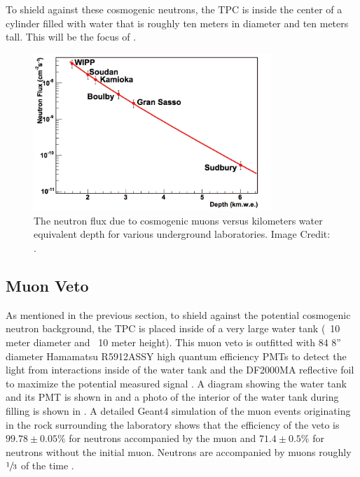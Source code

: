  To shield against these cosmogenic neutrons, the TPC is inside the center of a cylinder filled with water that is roughly ten meters in diameter and ten meters tall.  This will be the focus of . 
 
\begin{figure}[t]
	\centering
	\includegraphics[width=0.8\textwidth]{neutron_flux}
	\caption{The neutron flux due to cosmogenic muons versus kilometers water equivalent depth for various underground laboratories.    Image Credit: .}
	\label{fig:neutron_flux}
\end{figure}
 
 
 \subsection{Muon Veto}
 \label{sec:muon_veto}
 
 As mentioned in the previous section, to shield against the potential cosmogenic neutron background, the TPC is placed inside of a very large water tank (~10 meter diameter and ~10 meter height).  This muon veto is outfitted with 84 8'' diameter Hamamatsu R5912ASSY high quantum efficiency PMTs to detect the light from interactions inside of the water tank and the DF2000MA reflective foil to maximize the potential measured signal \cite{aprile2014conceptual}.  A diagram showing the water tank and its PMT is shown in  and a photo of the interior of the water tank during filling is shown in .  A detailed Geant4 simulation \cite{agostinelli2003geant4} of the muon events originating in the rock surrounding the laboratory shows that the efficiency of the veto is $99.78 \pm 0.05 \%$ for neutrons accompanied by the muon and $71.4 \pm 0.5 \%$ for neutrons without the initial muon.  Neutrons are accompanied by muons roughly $\sfrac{1}{3}$ of the time \cite{aprile2014conceptual}.  
 
